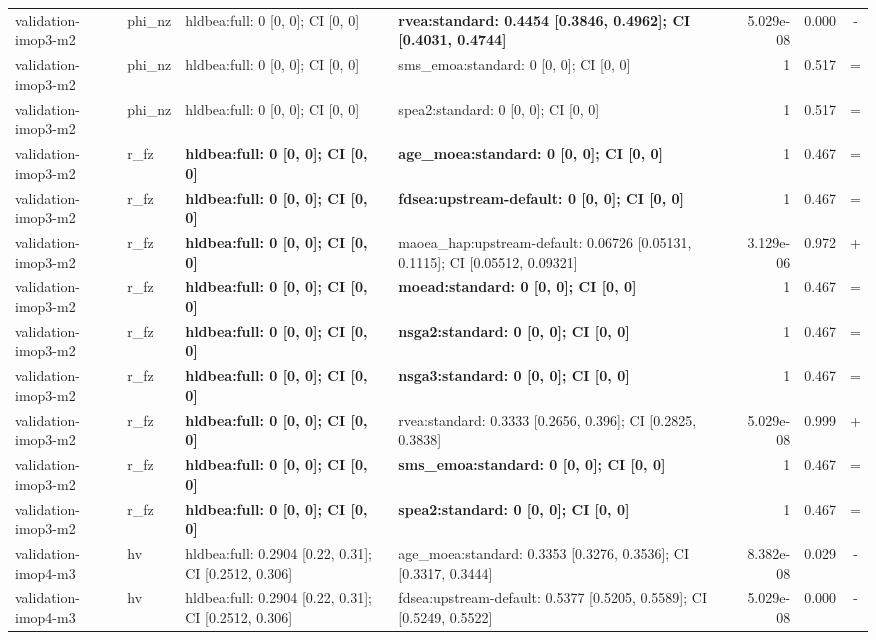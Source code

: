 \begin{tabular}{llllrrc}
validation-imop3-m2 & phi\_nz & hldbea:full: 0 [0, 0]; CI [0, 0] & \textbf{rvea:standard: 0.4454 [0.3846, 0.4962]; CI [0.4031, 0.4744]} & 5.029e-08 & 0.000 & - \\
validation-imop3-m2 & phi\_nz & hldbea:full: 0 [0, 0]; CI [0, 0] & sms\_emoa:standard: 0 [0, 0]; CI [0, 0] & 1 & 0.517 & = \\
validation-imop3-m2 & phi\_nz & hldbea:full: 0 [0, 0]; CI [0, 0] & spea2:standard: 0 [0, 0]; CI [0, 0] & 1 & 0.517 & = \\
validation-imop3-m2 & r\_fz & \textbf{hldbea:full: 0 [0, 0]; CI [0, 0]} & \textbf{age\_moea:standard: 0 [0, 0]; CI [0, 0]} & 1 & 0.467 & = \\
validation-imop3-m2 & r\_fz & \textbf{hldbea:full: 0 [0, 0]; CI [0, 0]} & \textbf{fdsea:upstream-default: 0 [0, 0]; CI [0, 0]} & 1 & 0.467 & = \\
validation-imop3-m2 & r\_fz & \textbf{hldbea:full: 0 [0, 0]; CI [0, 0]} & maoea\_hap:upstream-default: 0.06726 [0.05131, 0.1115]; CI [0.05512, 0.09321] & 3.129e-06 & 0.972 & + \\
validation-imop3-m2 & r\_fz & \textbf{hldbea:full: 0 [0, 0]; CI [0, 0]} & \textbf{moead:standard: 0 [0, 0]; CI [0, 0]} & 1 & 0.467 & = \\
validation-imop3-m2 & r\_fz & \textbf{hldbea:full: 0 [0, 0]; CI [0, 0]} & \textbf{nsga2:standard: 0 [0, 0]; CI [0, 0]} & 1 & 0.467 & = \\
validation-imop3-m2 & r\_fz & \textbf{hldbea:full: 0 [0, 0]; CI [0, 0]} & \textbf{nsga3:standard: 0 [0, 0]; CI [0, 0]} & 1 & 0.467 & = \\
validation-imop3-m2 & r\_fz & \textbf{hldbea:full: 0 [0, 0]; CI [0, 0]} & rvea:standard: 0.3333 [0.2656, 0.396]; CI [0.2825, 0.3838] & 5.029e-08 & 0.999 & + \\
validation-imop3-m2 & r\_fz & \textbf{hldbea:full: 0 [0, 0]; CI [0, 0]} & \textbf{sms\_emoa:standard: 0 [0, 0]; CI [0, 0]} & 1 & 0.467 & = \\
validation-imop3-m2 & r\_fz & \textbf{hldbea:full: 0 [0, 0]; CI [0, 0]} & \textbf{spea2:standard: 0 [0, 0]; CI [0, 0]} & 1 & 0.467 & = \\
validation-imop4-m3 & hv & hldbea:full: 0.2904 [0.22, 0.31]; CI [0.2512, 0.306] & age\_moea:standard: 0.3353 [0.3276, 0.3536]; CI [0.3317, 0.3444] & 8.382e-08 & 0.029 & - \\
validation-imop4-m3 & hv & hldbea:full: 0.2904 [0.22, 0.31]; CI [0.2512, 0.306] & fdsea:upstream-default: 0.5377 [0.5205, 0.5589]; CI [0.5249, 0.5522] & 5.029e-08 & 0.000 & - \\

\end{tabular}
